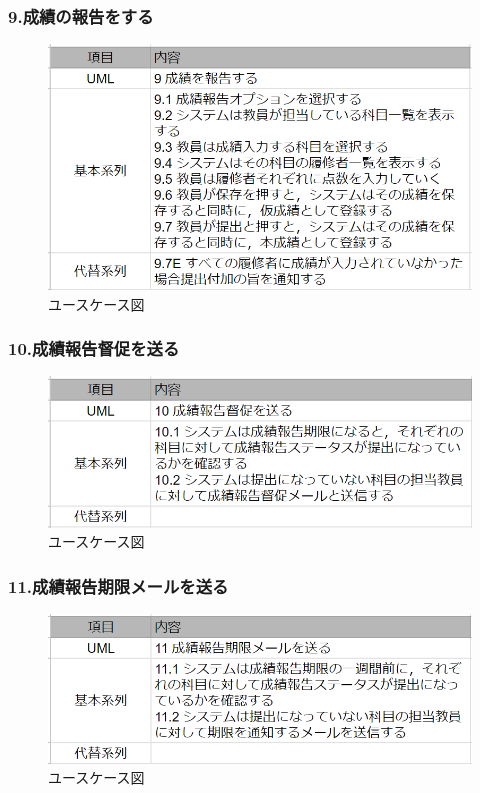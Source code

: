 \documentclass[documentclass]{jsarticle}
\begin{document}
\subsubsection*{9.成績の報告をする}
\begin{figure}[H]
  \begin{center}
    \includegraphics*[scale=0.6]{figure/4-9.png}
  \end{center}
  \caption{ユースケース図}
  \label{fig:4-9}
\end{figure}

\subsubsection*{10.成績報告督促を送る}
\begin{figure}[H]
  \begin{center}
    \includegraphics*[scale=0.6]{figure/4-10.png}
  \end{center}
  \caption{ユースケース図}
  \label{fig:4-10}
\end{figure}

\subsubsection*{11.成績報告期限メールを送る}
\begin{figure}[H]
  \begin{center}
    \includegraphics*[scale=0.6]{figure/4-11.png}
  \end{center}
  \caption{ユースケース図}
  \label{fig:4-11}
\end{figure}
\end{document}
